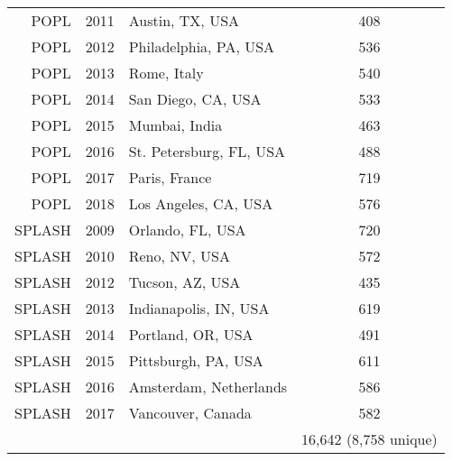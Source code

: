 \begin{table}
\begin{tabular}{r|l|l|c}
        POPL & 2011 & Austin, TX, USA & 408 \\
        POPL & 2012 & Philadelphia, PA, USA & 536 \\
        POPL & 2013 & Rome, Italy & 540 \\
        POPL & 2014 & San Diego, CA, USA & 533 \\
        POPL & 2015 & Mumbai, India & 463 \\
        POPL & 2016 & St. Petersburg, FL, USA & 488 \\
        POPL & 2017 & Paris, France & 719 \\
        POPL & 2018 & Los Angeles, CA, USA& 576 \\ \hline
      SPLASH & 2009 & Orlando, FL, USA & 720 \\
      SPLASH & 2010 & Reno, NV, USA & 572 \\
      SPLASH & 2012 & Tucson, AZ, USA & 435 \\
      SPLASH & 2013 & Indianapolis, IN, USA & 619 \\
      SPLASH & 2014 & Portland, OR, USA & 491 \\
      SPLASH & 2015 & Pittsburgh, PA, USA & 611 \\
      SPLASH & 2016 & Amsterdam, Netherlands & 586 \\
      SPLASH & 2017 & Vancouver, Canada & 582 \\ \hline
             &      &                   & 16,642 (8,758 unique)\\ \hline
    \end{tabular}
    \label{tab:my_label}
\end{table}
